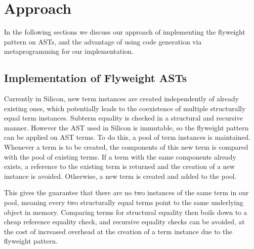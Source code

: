 \documentclass[11pt]{article}
\begin{document}
    \newpage
    \section{Approach}

    In the following sections we discuss our approach of implementing the flyweight pattern on
    ASTs, and the advantage of using code generation via metaprogramming for our implementation.

    \subsection{Implementation of Flyweight ASTs}

    Currently in Silicon, new term instances are created independently of already existing ones, which potentially leads 
    to the coexistence of multiple structurally equal term instances. Subterm equality is checked in a
    structural and recursive manner.
    However the AST used in Silicon is immutable, so the flyweight pattern \cite{patterns}
    can be applied on AST terms.
    To do this, a pool of term instances is maintained. Whenever a term
    is to be created, the components of this new term is compared with the
    pool of existing terms. If a term with the same components already exists,
    a reference to the existing term is returned and
    the creation of a new instance is avoided. Otherwise, a new term is created and added to
    the pool.

    This gives the guarantee that there are no two instances of the
    same term in our pool, meaning every two structurally equal terms point to the same
    underlying object in memory. Comparing terms for structural equality then boils
    down to a cheap reference equality check, and recursive equality checks can be avoided,
    at the cost of increased overhead at the creation of a term instance due to the flyweight pattern.
\end{document}
